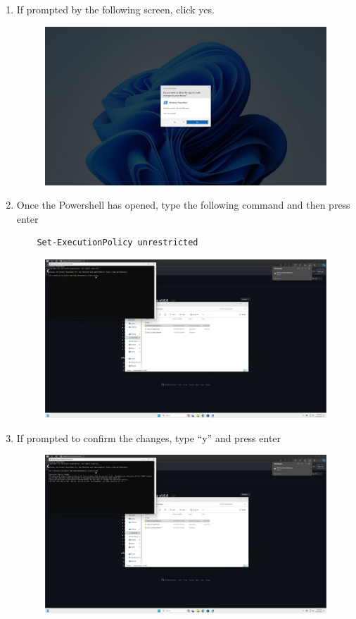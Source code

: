 \documentclass[12pt]{article}
\begin{document}
\begin{center}
\begin{enumerate}
\begin{figure}[H]
		      \end{figure}
		\item If prompted by the following screen, click yes.
		      \begin{figure}[H]
			      \includegraphics[width=\textwidth]{Figures/Windows-UAC-Prompt.png}
		      \end{figure}
		\item Once the Powershell has opened, type the following command and then press enter
		      \begin{verbatim}
    Set-ExecutionPolicy unrestricted
  \end{verbatim}
		      \begin{figure}[H]
			      \includegraphics[width=\textwidth]{Figures/Windows-Set-ExecutionPolicy-unrestricted.png}
		      \end{figure}
		\item If prompted to confirm the changes, type ``y'' and press enter
		      \begin{figure}[H]
			      \includegraphics[width=\textwidth]{Figures/Windows-Set-ExecutionPolicy-Confim.png}

\end{figure}
\end{enumerate}
\end{center}
\end{document}
